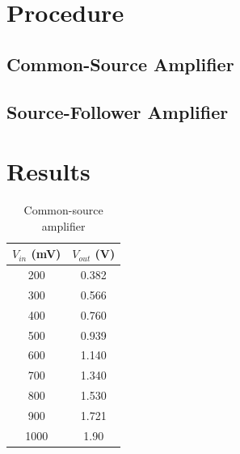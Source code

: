 \section{Procedure}
\label{sec:procedure}

\subsection{Common-Source Amplifier}
\label{sec:inverter}


\subsection{Source-Follower Amplifier}
\label{sec:smallsig}


\section{Results}
\label{sec:results}


\begin{table}[hbtp]
  \centering
  \begin{tabular}{cc}
    $V_{in}$ (\si{mV}) & $V_{out}$ (\si{V}) \\
    \hline
    200          & 0.382         \\
    300          & 0.566         \\
    400          & 0.760         \\
    500          & 0.939         \\
    600          & 1.140         \\
    700          & 1.340         \\
    800          & 1.530         \\
    900          & 1.721         \\
    1000         & 1.90          \\
  \end{tabular}
  \caption{\label{tab:common-source} Common-source amplifier}
\end{table}

